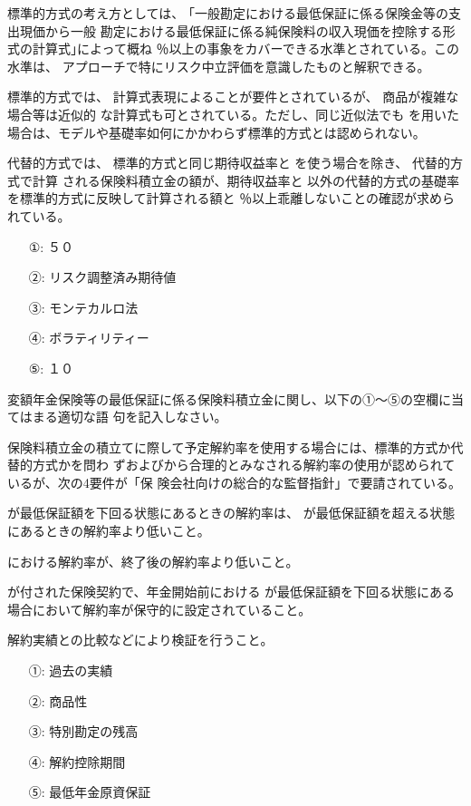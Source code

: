 \documentclass[report,gutter=10mm,fore-edge=10mm,uplatex,dvipdfmx]{jlreq}
\begin{document}
{標準的方式の考え方としては、 ｢一般勘定における最低保証に係る保険金等の支出現価から一般
勘定における最低保証に係る純保険料の収入現価を控除する形式の計算式｣によって概ね
％以上の事象をカバーできる水準とされている。この水準は、
アプローチで特にリスク中立評価を意識したものと解釈できる。

標準的方式では、 計算式表現によることが要件とされているが、 商品が複雑な場合等は近似的
な計算式も可とされている。ただし、同じ近似法でも
を用いた場合は、モデルや基礎率如何にかかわらず標準的方式とは認められない。

代替的方式では、 標準的方式と同じ期待収益率と
を使う場合を除き、 代替的方式で計算
される保険料積立金の額が、期待収益率と
以外の代替的方式の基礎率を標準的方式に反映して計算される額と
％以上乖離しないことの確認が求められている。
\answer{}
\begin{itemize}
 \item[①: ]  ５０
 \item[②: ]  リスク調整済み期待値
 \item[③: ]  モンテカルロ法
 \item[④: ]  ボラティリティー
 \item[⑤: ]  １０
\end{itemize}

変額年金保険等の最低保証に係る保険料積立金に関し、以下の①～⑤の空欄に当てはまる適切な語
句を記入しなさい。

保険料積立金の積立てに際して予定解約率を使用する場合には、標準的方式か代替的方式かを問わ
ずおよびから合理的とみなされる解約率の使用が認められているが、次の4要件が「保
険会社向けの総合的な監督指針」で要請されている。

が最低保証額を下回る状態にあるときの解約率は、
が最低保証額を超える状態にあるときの解約率より低いこと。

における解約率が、終了後の解約率より低いこと。

が付された保険契約で、年金開始前における
が最低保証額を下回る状態にある場合において解約率が保守的に設定されていること。

解約実績との比較などにより検証を行うこと。

\answer{}
\begin{itemize}
\item[①: ] 過去の実績
\item[②: ] 商品性
\item[③: ] 特別勘定の残高
\item[④: ] 解約控除期間
\item[⑤: ] 最低年金原資保証
\end{itemize}

}
\end{document}
